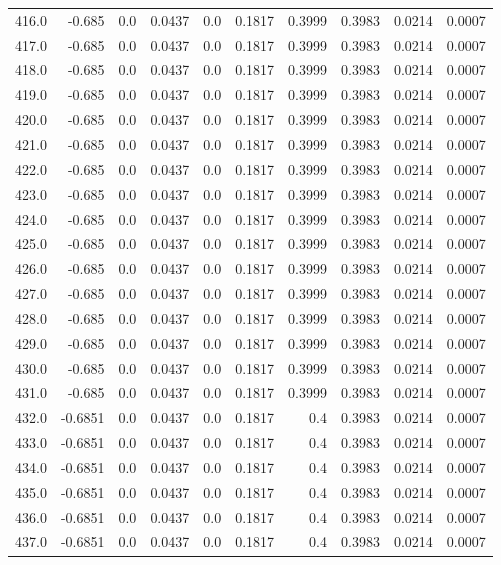 \begin{longtable}{lrrrrrrrrr}
416.0 & -0.685 & 0.0 & 0.0437 & 0.0 & 0.1817 & 0.3999 & 0.3983 & 0.0214 & 0.0007 \\
417.0 & -0.685 & 0.0 & 0.0437 & 0.0 & 0.1817 & 0.3999 & 0.3983 & 0.0214 & 0.0007 \\
418.0 & -0.685 & 0.0 & 0.0437 & 0.0 & 0.1817 & 0.3999 & 0.3983 & 0.0214 & 0.0007 \\
419.0 & -0.685 & 0.0 & 0.0437 & 0.0 & 0.1817 & 0.3999 & 0.3983 & 0.0214 & 0.0007 \\
420.0 & -0.685 & 0.0 & 0.0437 & 0.0 & 0.1817 & 0.3999 & 0.3983 & 0.0214 & 0.0007 \\
421.0 & -0.685 & 0.0 & 0.0437 & 0.0 & 0.1817 & 0.3999 & 0.3983 & 0.0214 & 0.0007 \\
422.0 & -0.685 & 0.0 & 0.0437 & 0.0 & 0.1817 & 0.3999 & 0.3983 & 0.0214 & 0.0007 \\
423.0 & -0.685 & 0.0 & 0.0437 & 0.0 & 0.1817 & 0.3999 & 0.3983 & 0.0214 & 0.0007 \\
424.0 & -0.685 & 0.0 & 0.0437 & 0.0 & 0.1817 & 0.3999 & 0.3983 & 0.0214 & 0.0007 \\
425.0 & -0.685 & 0.0 & 0.0437 & 0.0 & 0.1817 & 0.3999 & 0.3983 & 0.0214 & 0.0007 \\
426.0 & -0.685 & 0.0 & 0.0437 & 0.0 & 0.1817 & 0.3999 & 0.3983 & 0.0214 & 0.0007 \\
427.0 & -0.685 & 0.0 & 0.0437 & 0.0 & 0.1817 & 0.3999 & 0.3983 & 0.0214 & 0.0007 \\
428.0 & -0.685 & 0.0 & 0.0437 & 0.0 & 0.1817 & 0.3999 & 0.3983 & 0.0214 & 0.0007 \\
429.0 & -0.685 & 0.0 & 0.0437 & 0.0 & 0.1817 & 0.3999 & 0.3983 & 0.0214 & 0.0007 \\
430.0 & -0.685 & 0.0 & 0.0437 & 0.0 & 0.1817 & 0.3999 & 0.3983 & 0.0214 & 0.0007 \\
431.0 & -0.685 & 0.0 & 0.0437 & 0.0 & 0.1817 & 0.3999 & 0.3983 & 0.0214 & 0.0007 \\
432.0 & -0.6851 & 0.0 & 0.0437 & 0.0 & 0.1817 & 0.4 & 0.3983 & 0.0214 & 0.0007 \\
433.0 & -0.6851 & 0.0 & 0.0437 & 0.0 & 0.1817 & 0.4 & 0.3983 & 0.0214 & 0.0007 \\
434.0 & -0.6851 & 0.0 & 0.0437 & 0.0 & 0.1817 & 0.4 & 0.3983 & 0.0214 & 0.0007 \\
435.0 & -0.6851 & 0.0 & 0.0437 & 0.0 & 0.1817 & 0.4 & 0.3983 & 0.0214 & 0.0007 \\
436.0 & -0.6851 & 0.0 & 0.0437 & 0.0 & 0.1817 & 0.4 & 0.3983 & 0.0214 & 0.0007 \\
437.0 & -0.6851 & 0.0 & 0.0437 & 0.0 & 0.1817 & 0.4 & 0.3983 & 0.0214 & 0.0007 \\

\end{longtable}
